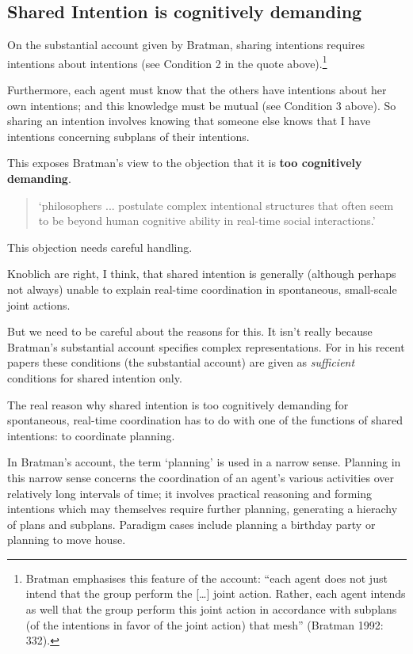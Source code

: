 \documentclass[14pt,a4paper]{extarticle}
\begin{document}
\subsection{Shared Intention is cognitively demanding}
On the substantial account given by Bratman, sharing intentions requires intentions about intentions (see Condition 2 in the quote above).\footnote{
Bratman emphasises this feature of the account: “each agent does not just intend that the group perform the […] joint action. Rather, each agent intends as well that the group perform this joint action in accordance with subplans (of the intentions in favor of the joint action) that mesh” (Bratman 1992: 332).
}

Furthermore, each agent must know that the others have intentions about her own intentions; and this knowledge must be mutual (see Condition 3 above).  So sharing an intention involves knowing that someone else knows that I have intentions concerning subplans of their intentions.  
   
This exposes Bratman's view to the objection that it is \textbf{too cognitively demanding}.  
%
\begin{quote}
`philosophers ... postulate complex intentional structures that often seem to be beyond human cognitive ability in real-time social interactions.'
\citep[p.\ 2022]{Knoblich:2008hy}
\end{quote}
%
This objection needs careful handling.  

Knoblich are right, I think, that shared intention is generally (although perhaps not always) unable to explain real-time coordination in spontaneous, small-scale joint actions.

But we need to be careful about the reasons for this.  It isn't really because Bratman's substantial account specifies complex representations.  For in his recent papers these conditions (the substantial account) are given as \emph{sufficient}  conditions for shared intention only.

The real reason why shared intention is too cognitively demanding for spontaneous, real-time coordination has to do with one of the functions of shared intentions: to coordinate planning.  

In Bratman’s account, the term `planning' is used in a narrow sense.  Planning in this narrow sense concerns the coordination of an agent’s various activities over relatively long intervals of time; it involves practical reasoning and forming intentions which may themselves require further planning, generating a hierachy of plans and subplans.  Paradigm cases include planning a birthday party or planning to move house.   
\end{document}
